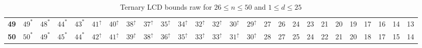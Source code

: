 \begin{table}
\begin{tabular}{|c| c c c c c c c c c c c c c c c c c c c c c c c c c |}
\textbf{49} & $49^*$ & $48^*$ & $44^*$ & $43^*$ & $41^\uparrow$ & $40^\uparrow$ & $38^\uparrow$ & $37^\uparrow$ & $35^\uparrow$ & $34^\uparrow$ & $32^\uparrow$ & $32^\uparrow$ & $30^\uparrow$ & $29^\uparrow$ & 27 & 26 & 24 & 23 & 21 & 20 & 19 & 17 & 16 & 14 & 13 \\
\textbf{50} & $50^*$ & $49^*$ & $45^*$ & $44^*$ & $42^\uparrow$ & $41^\uparrow$ & $39^\uparrow$ & $38^\uparrow$ & $36^\uparrow$ & $35^\uparrow$ & $33^\uparrow$ & $33^\uparrow$ & $31^\uparrow$ & $30^\uparrow$ & 28 & 27 & 25 & 24 & 22 & 21 & 20 & 18 & 17 & 15 & 14 \\
\hline
\end{tabular}
\caption{Ternary LCD bounds raw for $26 \leq n \leq 50$ and $1 \leq d \leq 25$}
\label{tab:lp_tables_q3_26_50_1_25}
\end{table}